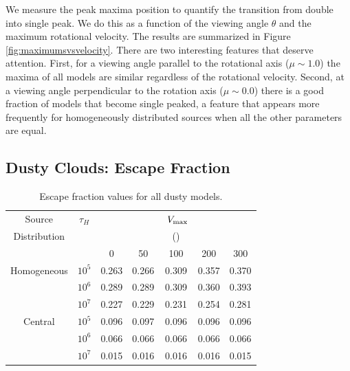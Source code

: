 \documentclass{emulateapj}
\newcommand{\kms}{{\ifmmode{{\mathrm{\,km\ s}^{-1}}}\else{\,km~s$^{-1}$}\fi}}
\begin{document}
We measure the peak maxima position to quantify the transition from
double into single peak. We do this as a function of the viewing angle
$\theta$ and the maximum rotational velocity. The results are
summarized in Figure  \ref{fig:maximumsvsvelocity}. There are two
interesting features that deserve attention. First, for a viewing angle
parallel to the rotational axis ($\mu\sim 1.0$) the maxima of all
models are similar regardless of the rotational velocity. Second, at a
viewing angle perpendicular to the rotation axis ($\mu\sim 0.0$) there
is a good fraction of models that become single peaked, a feature that
appears more frequently for homogeneously distributed sources when all
the other parameters are equal.

\subsection{Dusty Clouds: Escape Fraction}
\label{sec:escapefraction}

\begin{table}
\begin{center}
\begin{tabular}{c ccc ccc}
\hline \hline
Source & $\tau_{H}$ & & & $\ V_{\rm max}$& & \\
Distribution& &  &  & (\kms) & & \\ 
& & 0 & 50 & 100 &200 & 300\\ \hline 
Homogeneous & $10^{5}$& 0.263 & 0.266 &  0.309 &  0.357 &  0.370  \\
            & $10^{6}$ & 0.289 &  0.289 &   0.309 &  0.360 &  0.393 \\
            &$10^{7}$ &  0.227 &  0.229 &  0.231 &  0.254 &  0.281 \\
Central & $10^{5}$ &  0.096 & 0.097 & 0.096 &  0.096 & 0.096 \\
  		&$10^{6}$ & 0.066 & 0.066 &  0.066 &  0.066 &  0.066 \\
 		&$10^{7}$ & 0.015 &  0.016 & 0.016 & 0.016 & 0.015 \\
\hline
\end{tabular}
\caption{
 Escape fraction values for all dusty models. } 
\label{table:escape}
\end{center}
\end{table}
\end{document}
